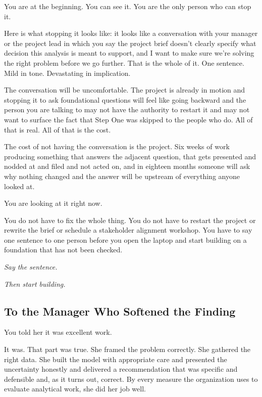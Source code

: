 You are at the beginning. You can see it. You are the only person who can stop it.

Here is what stopping it looks like: it looks like a conversation with your manager or the project lead in which you say the project brief doesn't clearly specify what decision this analysis is meant to support, and I want to make sure we're solving the right problem before we go further. That is the whole of it. One sentence. Mild in tone. Devastating in implication.

The conversation will be uncomfortable. The project is already in motion and stopping it to ask foundational questions will feel like going backward and the person you are talking to may not have the authority to restart it and may not want to surface the fact that Step One was skipped to the people who do. All of that is real. All of that is the cost.

The cost of not having the conversation is the project. Six weeks of work producing something that answers the adjacent question, that gets presented and nodded at and filed and not acted on, and in eighteen months someone will ask why nothing changed and the answer will be upstream of everything anyone looked at.

You are looking at it right now.

You do not have to fix the whole thing. You do not have to restart the project or rewrite the brief or schedule a stakeholder alignment workshop. You have to say one sentence to one person before you open the laptop and start building on a foundation that has not been checked.

\textit{Say the sentence.}

\textit{Then start building.}

\subsection*{To the Manager Who Softened the Finding}

You told her it was excellent work.

It was. That part was true. She framed the problem correctly. She gathered the right data. She built the model with appropriate care and presented the uncertainty honestly and delivered a recommendation that was specific and defensible and, as it turns out, correct. By every measure the organization uses to evaluate analytical work, she did her job well.

